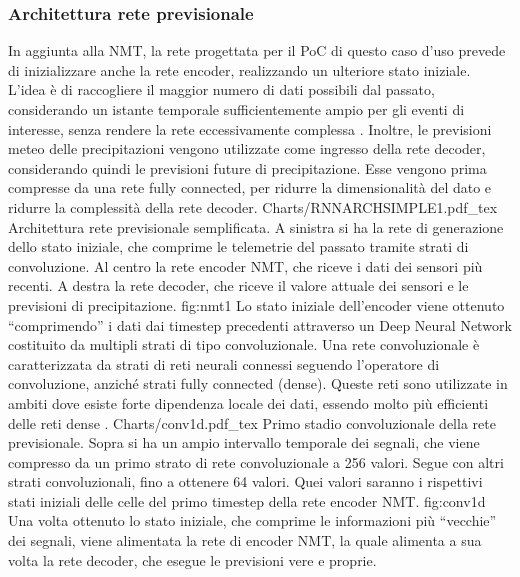 \subsubsection{Architettura rete previsionale}\label{generativernn}
In aggiunta alla NMT, la rete progettata per il PoC di questo caso d’uso prevede di inizializzare anche la rete encoder, realizzando un ulteriore stato iniziale. L’idea è di raccogliere il maggior numero di dati possibili dal passato, considerando un istante temporale sufficientemente ampio per gli eventi di interesse, senza rendere la rete eccessivamente complessa \cite{leguennec}. Inoltre, le previsioni meteo delle precipitazioni vengono utilizzate come ingresso della rete decoder, considerando quindi le previsioni future di precipitazione. Esse vengono prima compresse da una rete fully connected, per ridurre la dimensionalità del dato e ridurre la complessità della rete decoder.
\svg
{Charts/RNNARCHSIMPLE1.pdf_tex}
{Architettura rete previsionale semplificata. A sinistra si ha la rete di generazione dello stato iniziale, che comprime le telemetrie del passato tramite strati di convoluzione. Al centro la rete encoder NMT, che riceve i dati dei sensori più recenti. A destra la rete decoder, che riceve il valore attuale dei sensori e le previsioni di precipitazione. } 
{fig:nmt1}
Lo stato iniziale dell’encoder viene ottenuto “comprimendo” i dati dai timestep precedenti attraverso un Deep Neural Network costituito da multipli strati di tipo convoluzionale. Una rete convoluzionale è caratterizzata da strati di reti neurali connessi seguendo l’operatore di convoluzione, anziché strati fully connected (dense). Queste reti sono utilizzate in ambiti dove esiste forte dipendenza locale dei dati, essendo molto più efficienti delle reti dense \cite{aggarwal}.
\svg
{Charts/conv1d.pdf_tex}
{Primo stadio convoluzionale della rete previsionale. Sopra si ha un ampio intervallo temporale dei segnali, che viene compresso da un primo strato di rete convoluzionale a 256 valori. Segue con altri strati convoluzionali, fino a ottenere 64 valori. Quei valori saranno i rispettivi stati iniziali delle celle del primo timestep della rete encoder NMT. }
{fig:conv1d}
Una volta ottenuto lo stato iniziale, che comprime le informazioni più “vecchie” dei segnali, viene alimentata la rete di encoder NMT, la quale alimenta a sua volta la rete decoder, che esegue le previsioni vere e proprie.
